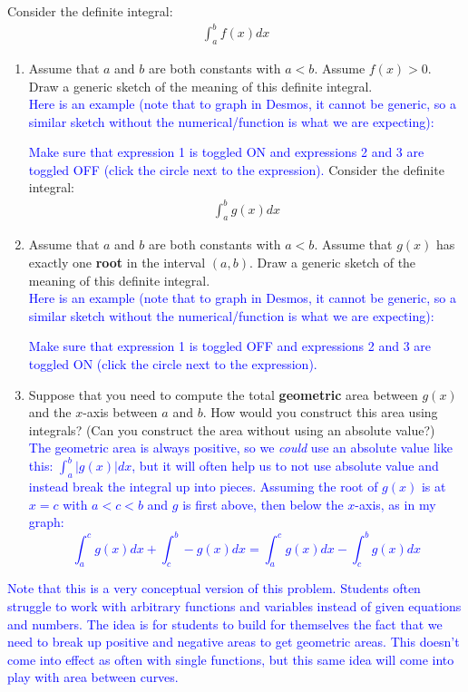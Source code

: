\documentclass{ximera}
\begin{document}
\begin{exercise}
Consider the definite integral:
\begin{align}
	\int_{a}^b f(x) dx \nonumber
\end{align}
    \begin{enumerate}
        \item Assume that $a$ and $b$ are both constants with $a < b$. Assume $f(x)>0$. Draw a generic sketch of the meaning of this definite integral. \\
        \textcolor{blue}{Here is an example (note that to graph in Desmos, it cannot be generic, so a similar sketch without the numerical/function is what we are expecting):}
        \begin{center}
        \end{center}
        \textcolor{blue}{Make sure that expression 1 is toggled ON and expressions 2 and 3 are toggled OFF (click the circle next to the expression).}
         Consider the definite integral:
\begin{align}
	\int_{a}^b g(x) dx \nonumber
\end{align}
        \item Assume that $a$ and $b$ are both constants with $a < b$. Assume that $g(x)$ has exactly one {\bf{root}} in the interval $(a,b)$. Draw a generic sketch of the meaning of this definite integral.\\
        \textcolor{blue}{Here is an example (note that to graph in Desmos, it cannot be generic, so a similar sketch without the numerical/function is what we are expecting):}
        \begin{center}
        \end{center}
        \textcolor{blue}{Make sure that expression 1 is toggled OFF and expressions 2 and 3 are toggled ON (click the circle next to the expression).}

        \item Suppose that you need to compute the total {\bf{geometric}} area between $g(x)$ and the $x$-axis between $a$ and $b$. How would you construct this area using integrals? (Can you construct the area without using an absolute value?)\\
        \textcolor{blue}{The geometric area is always positive, so we \textit{could} use an absolute value like this: $\int_a^b |g(x)|dx$, but it will often help us to not use absolute value and instead break the integral up into pieces.  Assuming the root of $g(x)$ is at $x=c$ with $a<c<b$ and $g$ is first above, then below the $x$-axis, as in my graph:
        \[\int_a^c g(x)dx+\int_c^b -g(x)dx=\int_a^c g(x)dx-\int_c^b g(x)dx\]}
    \end{enumerate}
    \textcolor{blue}{Note that this is a very conceptual version of this problem.  Students often struggle to work with arbitrary functions and variables instead of given equations and numbers. The idea is for students to build for themselves the fact that we need to break up positive and negative areas to get geometric areas.  This doesn't come into effect as often with single functions, but this same idea will come into play with area between curves.}


\end{exercise}
\end{document}
